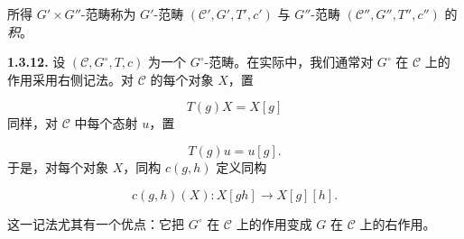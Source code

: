 所得 $G'\times G''$-范畴称为 $G'$-范畴 $(\mathcal C',G',T',c')$ 与
$G''$-范畴 $(\mathcal C'',G'',T'',c'')$ 的\emph{积}。

\noindent\textbf{1.3.12.}\quad
设 $(\mathcal C,G^\circ,T,c)$ 为一个 $G^\circ$-范畴。在实际中，我们通常对
$G^\circ$ 在 $\mathcal C$ 上的作用采用右侧记法。对 $\mathcal C$ 的每个对象
$X$，置

\begin{equation}
  T(g)X=X[g]
  \tag{1.3.12.1}
\end{equation}
同样，对 $\mathcal C$ 中每个态射 $u$，置

\begin{equation}
  T(g)u=u[g].
  \tag{1.3.12.2}
\end{equation}
于是，对每个对象 $X$，同构 $c(g,h)$ 定义同构

\begin{equation}
  c(g,h)(X)\colon X[gh]\longrightarrow X[g][h].
  \tag{1.3.12.3}
\end{equation}

这一记法尤其有一个优点：它把 $G^\circ$ 在 $\mathcal C$ 上的作用变成 $G$ 在
$\mathcal C$ 上的右作用。
